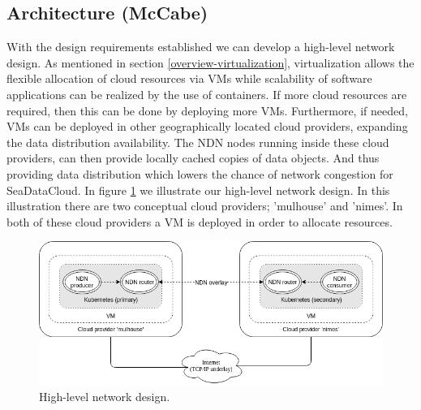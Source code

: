 \subsection{Architecture (McCabe)}
\label{planning-architecture}
With the design requirements established we can develop a high-level network design. As mentioned in section \ref{overview-virtualization}, virtualization allows the flexible allocation of cloud resources via VMs while scalability of software applications can be realized by the use of containers. If more cloud resources are required, then this can be done by deploying more VMs. Furthermore, if needed, VMs can be deployed in other geographically located cloud providers, expanding the data distribution availability. The NDN nodes running inside these cloud providers, can then provide locally cached copies of data objects. And thus providing data distribution which lowers the chance of network congestion for SeaDataCloud. In figure \ref{fig:high-level-network-design} we illustrate our high-level network design. In this illustration there are two conceptual cloud providers; 'mulhouse' and 'nimes'. In both of these cloud providers a VM is deployed in order to allocate resources.

\begin{figure}[H]
\centering
\includegraphics[width=\columnwidth]{Images/high-level-network-design.png}
\caption{High-level network design.}
\label{fig:high-level-network-design}
\end{figure}

